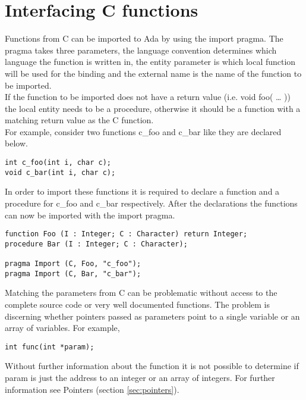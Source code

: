 \section{Interfacing C functions}\label{sec:cfunc}
Functions from C can be imported to Ada by using the import pragma. The pragma takes three parameters, the language convention determines which language the function is written in, the entity parameter is which local function will be used for the binding and the external name is the name of the function to be imported.\\
If the function to be imported does not have a return value (i.e. void foo( … )) the local entity needs to be a procedure, otherwise it should be a function with a matching return value as the C function.\\
For example, consider two functions c_foo and c_bar like they are declared below.
\begin{lstlisting}
int c_foo(int i, char c);
void c_bar(int i, char c);
\end{lstlisting}
In order to import these functions it is required to declare a function and a procedure for c_foo and c_bar respectively. After the declarations the functions can now be imported with the import pragma.
\begin{lstlisting}
function Foo (I : Integer; C : Character) return Integer;
procedure Bar (I : Integer; C : Character);

pragma Import (C, Foo, "c_foo");
pragma Import (C, Bar, "c_bar");
\end{lstlisting}
Matching the parameters from C can be problematic without access to the complete source code or very well documented functions. The problem is discerning whether pointers passed as parameters point to a single variable or an array of variables. For example,
\begin{lstlisting}
int func(int *param);
\end{lstlisting}
Without further information about the function it is not possible to determine if param is just the address to an integer or an array of integers. For further information see Pointers (section \ref{sec:pointers}).
